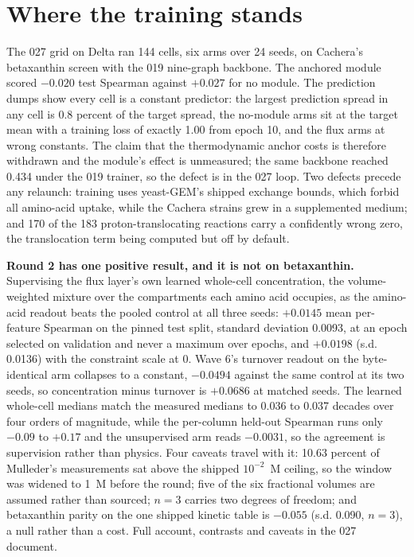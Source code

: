 
\section{Where the training stands}
\label{sec:status}

The 027 grid on Delta ran 144 cells, six arms over 24 seeds, on Cachera's betaxanthin
screen with the 019 nine-graph backbone. The anchored module scored $-0.020$ test Spearman
against $+0.027$ for no module. The prediction dumps show every cell is a constant
predictor: the largest prediction spread in any cell is 0.8 percent of the target
spread, the no-module arms sit at the target mean with a training loss of exactly 1.00 from
epoch 10, and the flux arms at wrong constants. The claim that the thermodynamic anchor
costs is therefore withdrawn and the module's effect is unmeasured; the same backbone
reached 0.434 under the 019 trainer, so the defect is in the 027 loop. Two defects precede
any relaunch: training uses yeast-GEM's shipped exchange bounds, which forbid all
amino-acid uptake, while the Cachera strains grew in a supplemented medium; and 170 of the
183 proton-translocating reactions carry a confidently wrong zero, the translocation term
being computed but off by default.

\textbf{Round 2 has one positive result, and it is not on betaxanthin.} Supervising the
flux layer's own learned whole-cell concentration, the volume-weighted mixture over the
compartments each amino acid occupies, as the amino-acid readout beats the pooled control at
all three seeds: $+0.0145$ mean per-feature Spearman on the pinned test split, standard
deviation 0.0093, at an epoch selected on validation and never a maximum over epochs, and
$+0.0198$ (s.d. 0.0136) with the constraint scale at 0. Wave 6's turnover readout on the
byte-identical arm collapses to a constant, $-0.0494$ against the same control at its two
seeds, so concentration minus turnover is $+0.0686$ at matched seeds. The learned whole-cell
medians match the measured medians to 0.036 to 0.037 decades over four orders of magnitude,
while the per-column held-out Spearman runs only $-0.09$ to $+0.17$ and the unsupervised arm
reads $-0.0031$, so the agreement is supervision rather than physics. Four caveats travel
with it: 10.63 percent of Mulleder's measurements sat above the shipped $10^{-2}$~M ceiling,
so the window was widened to 1~M before the round; five of the six fractional volumes are
assumed rather than sourced; $n = 3$ carries two degrees of freedom; and betaxanthin parity
on the one shipped kinetic table is $-0.055$ (s.d. 0.090, $n = 3$), a null rather than a
cost. Full account, contrasts and caveats in the 027 document.

